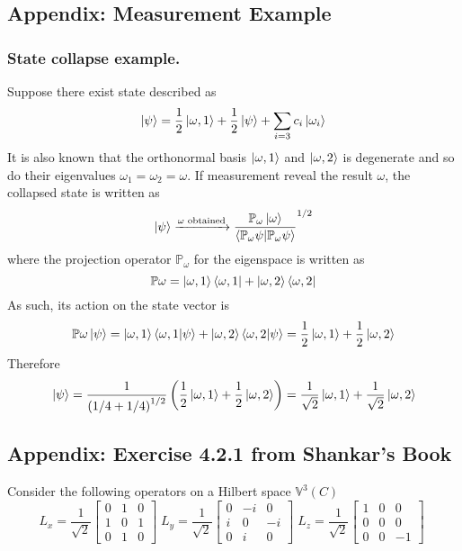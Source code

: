 \documentclass[../../../main.tex]{subfiles}
\begin{document}
\subsection{Appendix: Measurement Example}
\subsubsection{State collapse example.}
Suppose there exist  state described as 
\begin{equation*}
    \ket{\psi}=\frac{1 }{2}\ket{\omega,1}+\frac{1 }{2}\ket{\psi}+\sum_{i=3} c_i \ket{\omega_i}
\end{equation*}
It is also known that the orthonormal basis $\ket{\omega,1  }$ and $\ket{\omega,2}$ is degenerate and so do their eigenvalues $\omega_1=\omega_2=\omega$.
If measurement reveal the result $\omega$, the collapsed state is written as 
\begin{equation*}
    \ket{\psi}\xrightarrow{\omega\text{ obtained}}\frac{\mathbb{P}_\omega \ket{\omega }}{\braket{\mathbb{P}_\omega\psi|\mathbb{P }_\omega \psi}}^{1/2}
\end{equation*}
where the projection operator $\mathbb{P }_\omega$ for the eigenspace is written as 
\begin{equation*}
    \mathbb{P }\omega=\ket{\omega,1}\bra{\omega,1}+\ket{\omega,2}\bra{\omega,2}
\end{equation*} 
As such, its action on the state vector is 
\begin{equation*}
    \mathbb{P }\omega \ket{\psi}=\ket{\omega,1}\braket{\omega,1|\psi}+\ket{\omega,2}\braket{\omega,2|\psi}
    =\frac{1 }{2 }\ket{\omega,1}+\frac{1 }{2 }\ket{\omega,2}
\end{equation*}
Therefore
\begin{equation*}
    \ket{\psi}=\frac{1}{\left( 1/4+1/4 \right) ^{1/2}}\left(\frac{1 }{2 }\ket{\omega,1}+\frac{1 }{2 }\ket{\omega,2}\right)
    =\frac{1 }{\sqrt{2} }\ket{\omega,1}+\frac{1 }{\sqrt{2} }\ket{\omega,2}
\end{equation*}

\subsection{Appendix: Exercise 4.2.1 from Shankar's Book}
Consider the following operators on a Hilbert space $\mathbb{V}^3(C)$
\begin{equation*}
    L_x=\frac{1 }{\sqrt{2 }}\begin{bmatrix}
        0&1&0\\
        1&0&1\\
        0&1&0
    \end{bmatrix}\;
    L_y=\frac{1 }{\sqrt{2 }}\begin{bmatrix}
        0&-i&0\\
        i&0&-i\\
        0&i&0
    \end{bmatrix}\;
    L_z=\frac{1 }{\sqrt{2 }}\begin{bmatrix}
        1&0&0\\
        0&0&0\\
        0&0&-1
    \end{bmatrix}\;
\end{equation*}
\end{document}
